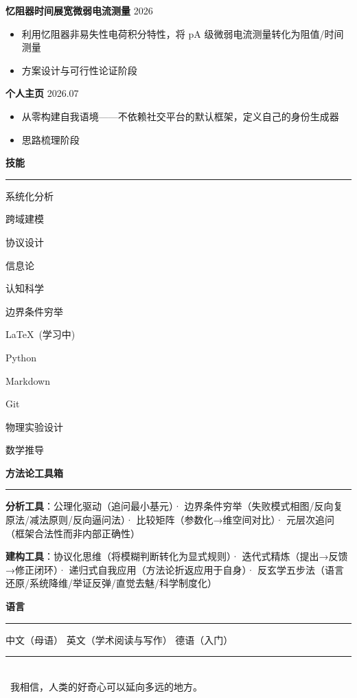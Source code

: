 \documentclass[11pt,a4paper]{ctexart}
\newcommand{\cvsection}[1]{
  \vspace{0.8em}
  \noindent
  {\color{primary}\large\textbf{#1}}
  \vspace{0.15em}
  \hrule
  \vspace{0.5em}
}
\newcommand{\cventry}[3]{
  \noindent
  \textbf{#1} \hfill \color{gray}\small #2
  \par\vspace{0.15em}
  \begin{itemize}
    #3
  \end{itemize}
}
\newcommand{\tagbox}[1]{
  \colorbox{accent!12}{\color{accent}\small\sffamily #1}
}
\begin{document}
\cventry{忆阻器时间展宽微弱电流测量}{2026}{
  \item 利用忆阻器非易失性电荷积分特性，将 pA 级微弱电流测量转化为阻值/时间测量
  \item 方案设计与可行性论证阶段
}

\cventry{个人主页}{2026.07}{
  \item 从零构建自我语境——不依赖社交平台的默认框架，定义自己的身份生成器
  \item 思路梳理阶段
}

\cvsection{ 技能}

\noindent
\tagbox{系统化分析} \quad
\tagbox{跨域建模} \quad
\tagbox{协议设计} \quad
\tagbox{信息论} \quad
\tagbox{认知科学} \quad
\tagbox{边界条件穷举}

\vspace{0.5em}

\noindent
\tagbox{\LaTeX\ (学习中)} \quad
\tagbox{Python} \quad
\tagbox{Markdown} \quad
\tagbox{Git} \quad
\tagbox{物理实验设计} \quad
\tagbox{数学推导}

\cvsection{ 方法论工具箱}

\noindent
\textbf{分析工具}：公理化驱动（追问最小基元）· 边界条件穷举（失败模式相图/反向复原法/减法原则/反向逼问法）· 比较矩阵（参数化→维空间对比）· 元层次追问（框架合法性而非内部正确性）

\vspace{0.3em}

\noindent
\textbf{建构工具}：协议化思维（将模糊判断转化为显式规则）· 迭代式精炼（提出→反馈→修正闭环）· 递归式自我应用（方法论折返应用于自身）· 反玄学五步法（语言还原/系统降维/举证反弹/直觉去魅/科学制度化）

\cvsection{ 语言}

\noindent
中文（母语） \hfill 英文（学术阅读与写作） \hfill 德语（入门）

\vspace{1.5em}
\begin{center}
  {\color{lightgray}\rule{0.5\textwidth}{0.3pt}} \\[0.3em]
  {\color{gray}\footnotesize {} \ 我相信，人类的好奇心可以延向多远的地方。 \ }
\end{center}
\end{document}
